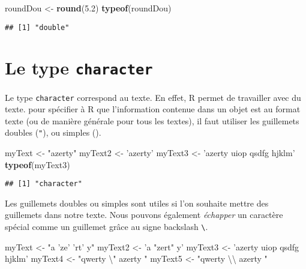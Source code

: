 \documentclass[]{book}
\newenvironment{Shaded}{\begin{snugshade}}{\end{snugshade}}
\newcommand{\KeywordTok}[1]{\textcolor[rgb]{0.13,0.29,0.53}{\textbf{#1}}}
\newcommand{\FloatTok}[1]{\textcolor[rgb]{0.00,0.00,0.81}{#1}}
\newcommand{\CharTok}[1]{\textcolor[rgb]{0.31,0.60,0.02}{#1}}
\newcommand{\StringTok}[1]{\textcolor[rgb]{0.31,0.60,0.02}{#1}}
\newcommand{\NormalTok}[1]{#1}
\theoremstyle{definition}
\theoremstyle{definition}
\theoremstyle{definition}
\theoremstyle{remark}
\begin{document}
\begin{Shaded}
\begin{Highlighting}[]
\NormalTok{roundDou <-}\StringTok{ }\KeywordTok{round}\NormalTok{(}\FloatTok{5.2}\NormalTok{)}
\KeywordTok{typeof}\NormalTok{(roundDou)}
\end{Highlighting}
\end{Shaded}

\begin{verbatim}
## [1] "double"
\end{verbatim}

\section{\texorpdfstring{Le type
\texttt{character}}{Le type character}}\label{le-type-character}

Le type \texttt{character} correspond au texte. En effet, R permet de
travailler avec du texte. pour spécifier à R que l'information contenue
dans un objet est au format texte (ou de manière générale pour tous les
textes), il faut utiliser les guillemets doubles (\texttt{"}), ou
simples (\texttt{\textquotesingle{}}).

\begin{Shaded}
\begin{Highlighting}[]
\NormalTok{myText <-}\StringTok{ "azerty"}
\NormalTok{myText2 <-}\StringTok{ 'azerty'}
\NormalTok{myText3 <-}\StringTok{ 'azerty uiop qsdfg hjklm'}
\KeywordTok{typeof}\NormalTok{(myText3)}
\end{Highlighting}
\end{Shaded}

\begin{verbatim}
## [1] "character"
\end{verbatim}

Les guillemets doubles ou simples sont utiles si l'on souhaite mettre
des guillemets dans notre texte. Nous pouvons également \emph{échapper}
un caractère spécial comme un guillemet grâce au signe backslash
\texttt{\textbackslash{}}.

\begin{Shaded}
\begin{Highlighting}[]
\NormalTok{myText <-}\StringTok{ "a 'ze' 'rt' y"}
\NormalTok{myText2 <-}\StringTok{ 'a "zert" y'}
\NormalTok{myText3 <-}\StringTok{ 'azerty uiop qsdfg hjklm'}
\NormalTok{myText4 <-}\StringTok{ "qwerty }\CharTok{\textbackslash{}"}\StringTok{ azerty "}
\NormalTok{myText5 <-}\StringTok{ "qwerty }\CharTok{\textbackslash{}\textbackslash{}}\StringTok{ azerty "}
\end{Highlighting}
\end{Shaded}
\end{document}
